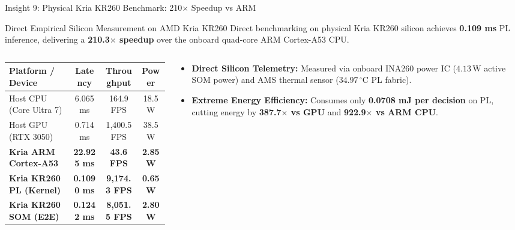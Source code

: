 \documentclass[aspectratio=169, 10pt]{beamer}
\begin{document}
\begin{frame}{Insight 9: Physical Kria KR260 Benchmark: 210$\times$ Speedup vs ARM}
  \begin{block}{Direct Empirical Silicon Measurement on AMD Kria KR260}
    Direct benchmarking on physical Kria KR260 silicon achieves \textbf{0.109 ms} PL inference, delivering a \textbf{210.3$\times$ speedup} over the onboard quad-core ARM Cortex-A53 CPU.
  \end{block}
  \vspace{-0.2cm}
  \begin{columns}[T]
    \begin{column}{0.54\textwidth}
      \setlength{\tabcolsep}{2pt}
      \begin{table}
        \centering
        \scriptsize
        \begin{tabular}{lccc}
          \toprule
          \textbf{Platform / Device} & \textbf{Latency} & \textbf{Throughput} & \textbf{Power} \\
          \midrule
          Host CPU (Core Ultra 7) & 6.065 ms & 164.9 FPS & 18.5 W \\
          Host GPU (RTX 3050) & 0.714 ms & 1,400.5 FPS & 38.5 W \\
          \textbf{Kria ARM Cortex-A53} & \textbf{22.925 ms} & \textbf{43.6 FPS} & \textbf{2.85 W} \\
          \textbf{Kria KR260 PL (Kernel)} & \textbf{0.1090 ms} & \textbf{9,174.3 FPS} & \textbf{0.65 W} \\
          \textbf{Kria KR260 SOM (E2E)} & \textbf{0.1242 ms} & \textbf{8,051.5 FPS} & \textbf{2.80 W} \\
          \bottomrule
        \end{tabular}
      \end{table}
    \end{column}
    \begin{column}{0.44\textwidth}
      \begin{itemize}
        \item \textbf{Direct Silicon Telemetry:} Measured via onboard INA260 power IC ($4.13\,\text{W}$ active SOM power) and AMS thermal sensor ($34.97\,^\circ\text{C}$ PL fabric).
        \item \textbf{Extreme Energy Efficiency:} Consumes only \textbf{0.0708 mJ per decision} on PL, cutting energy by \textbf{387.7$\times$ vs GPU} and \textbf{922.9$\times$ vs ARM CPU}.
      \end{itemize}
    \end{column}
  \end{columns}
\end{frame}
\end{document}
